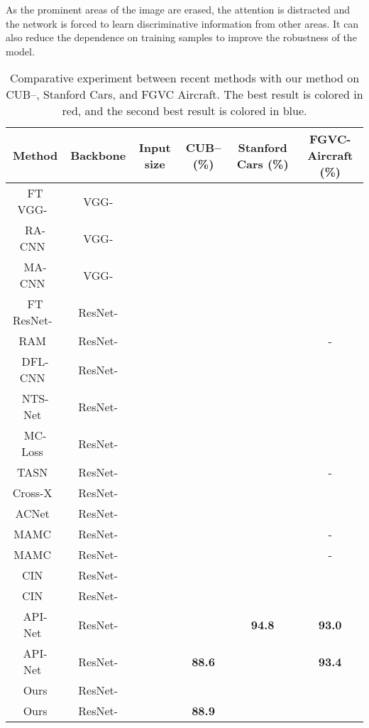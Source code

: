 \documentclass[conference]{IEEEtran}
\begin{document}
As the prominent areas of the image are erased, the attention is distracted and the network is forced to learn discriminative information from other areas. It can also reduce the dependence on training samples to improve the robustness of the model.
\begin{table*}[ht]
\begin{center}
\caption{Comparative experiment between recent methods with our method on CUB--, Stanford Cars, and FGVC Aircraft. The best result is colored in red, and the second best result is colored in blue.} \label{tab:results}
\begin{tabular}{c|c|c|c|c|c}
  \hline
  Method & Backbone & Input size & CUB-- (\%) & Stanford Cars (\%) & FGVC-Aircraft (\%) \\
  \hline
\hline
FT VGG-~\cite{wang2018learning} & VGG- &  &  &  &  \\
RA-CNN~\cite{fu2017look} & VGG- &  &  &  &  \\
MA-CNN~\cite{zheng2017recognition} & VGG- &  &  &  &  \\
  \hline
  FT ResNet-~\cite{wang2018learning} & ResNet- &  &  &  &  \\
    RAM~\cite{Li_2017_ICCV} & ResNet- &  &  &  & - \\

      DFL-CNN~\cite{wang2018learning} & ResNet- &  &  &  &  \\

      NTS-Net~\cite{yang2018learning} & ResNet- &  &  &  &  \\
        MC-Loss~\cite{chang2020mc} & ResNet- &  &  &  &  \\

      TASN~\cite{Zheng_2019_CVPR} & ResNet- &  &  &  & - \\
      Cross-X~\cite{luo2019cross} & ResNet- &  &  &  &  \\
      ACNet~\cite{2019ACNet} & ResNet- &  &  &  &  \\
    \hline
        MAMC~\cite{sun2018multi} & ResNet- &  &  &  & - \\
    MAMC~\cite{sun2018multi} & ResNet- &  &  &  & - \\
    \hline
      CIN~\cite{2020CIN} & ResNet- &  &  &  &  \\
        CIN~\cite{2020CIN} & ResNet- &  &  &  &  \\
    \hline
      API-Net~\cite{zhuang2020learning} & ResNet- &  &  & \textcolor[RGB]{0,0,255}{\textbf{94.8}} & \textcolor[RGB]{0,0,255}{\textbf{93.0}} \\
      API-Net~\cite{zhuang2020learning} & ResNet- &  & \textcolor[RGB]{0,0,255}{\textbf{88.6}} &  & \textcolor[RGB]{255,0,0}{\textbf{93.4}} \\
  \hline
      Ours & ResNet- &  &  &  &  \\
    Ours & ResNet- &  & \textcolor[RGB]{255,0,0}{\textbf{88.9}} &  &  \\
  \hline
\end{tabular}
\end{center}
\end{table*}
\end{document}

